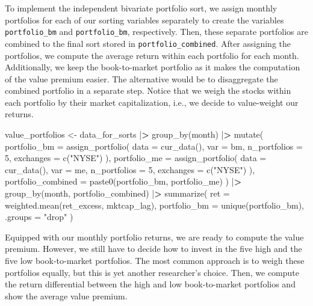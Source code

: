 \documentclass[
]{book}
\newenvironment{Shaded}{\begin{snugshade}}{\end{snugshade}}
\newcommand{\AttributeTok}[1]{\textcolor[rgb]{0.61,0.61,0.61}{#1}}
\newcommand{\DecValTok}[1]{\textcolor[rgb]{0.06,0.06,0.06}{#1}}
\newcommand{\ErrorTok}[1]{\textcolor[rgb]{0.14,0.14,0.14}{\textbf{#1}}}
\newcommand{\FunctionTok}[1]{\textcolor[rgb]{0,0,0}{#1}}
\newcommand{\NormalTok}[1]{#1}
\newcommand{\OtherTok}[1]{\textcolor[rgb]{0.37,0.37,0.37}{#1}}
\newcommand{\SpecialCharTok}[1]{\textcolor[rgb]{0,0,0}{#1}}
\newcommand{\StringTok}[1]{\textcolor[rgb]{0.5,0.5,0.5}{#1}}
\begin{document}
To implement the independent bivariate portfolio sort, we assign monthly portfolios for each of our sorting variables separately to create the variables \texttt{portfolio\_bm} and \texttt{portfolio\_bm}, respectively. Then, these separate portfolios are combined to the final sort stored in \texttt{portfolio\_combined}. After assigning the portfolios, we compute the average return within each portfolio for each month. Additionally, we keep the book-to-market portfolio as it makes the computation of the value premium easier. The alternative would be to disaggregate the combined portfolio in a separate step. Notice that we weigh the stocks within each portfolio by their market capitalization, i.e., we decide to value-weight our returns.

\begin{Shaded}
\begin{Highlighting}[]
\NormalTok{value\_portfolios }\OtherTok{\textless{}{-}}\NormalTok{ data\_for\_sorts }\SpecialCharTok{|}\ErrorTok{\textgreater{}}
  \FunctionTok{group\_by}\NormalTok{(month) }\SpecialCharTok{|}\ErrorTok{\textgreater{}}
  \FunctionTok{mutate}\NormalTok{(}
    \AttributeTok{portfolio\_bm =} \FunctionTok{assign\_portfolio}\NormalTok{(}
      \AttributeTok{data =} \FunctionTok{cur\_data}\NormalTok{(),}
      \AttributeTok{var =}\NormalTok{ bm,}
      \AttributeTok{n\_portfolios =} \DecValTok{5}\NormalTok{,}
      \AttributeTok{exchanges =} \FunctionTok{c}\NormalTok{(}\StringTok{"NYSE"}\NormalTok{)}
\NormalTok{    ),}
    \AttributeTok{portfolio\_me =} \FunctionTok{assign\_portfolio}\NormalTok{(}
      \AttributeTok{data =} \FunctionTok{cur\_data}\NormalTok{(),}
      \AttributeTok{var =}\NormalTok{ me,}
      \AttributeTok{n\_portfolios =} \DecValTok{5}\NormalTok{,}
      \AttributeTok{exchanges =} \FunctionTok{c}\NormalTok{(}\StringTok{"NYSE"}\NormalTok{)}
\NormalTok{    ),}
    \AttributeTok{portfolio\_combined =} \FunctionTok{paste0}\NormalTok{(portfolio\_bm, portfolio\_me)}
\NormalTok{  ) }\SpecialCharTok{|}\ErrorTok{\textgreater{}}
  \FunctionTok{group\_by}\NormalTok{(month, portfolio\_combined) }\SpecialCharTok{|}\ErrorTok{\textgreater{}}
  \FunctionTok{summarize}\NormalTok{(}
    \AttributeTok{ret =} \FunctionTok{weighted.mean}\NormalTok{(ret\_excess, mktcap\_lag),}
    \AttributeTok{portfolio\_bm =} \FunctionTok{unique}\NormalTok{(portfolio\_bm),}
    \AttributeTok{.groups =} \StringTok{"drop"}
\NormalTok{  )}
\end{Highlighting}
\end{Shaded}

Equipped with our monthly portfolio returns, we are ready to compute the value premium. However, we still have to decide how to invest in the five high and the five low book-to-market portfolios. The most common approach is to weigh these portfolios equally, but this is yet another researcher's choice. Then, we compute the return differential between the high and low book-to-market portfolios and show the average value premium.
\end{document}
